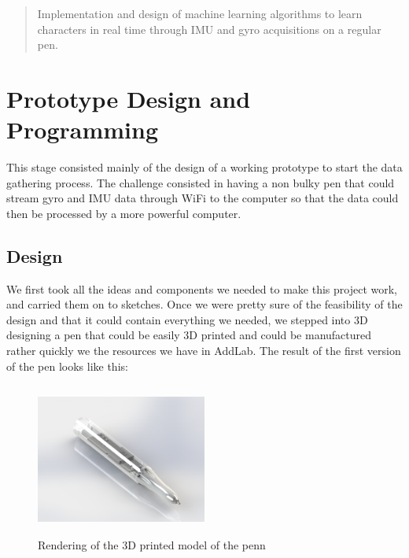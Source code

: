 \documentclass{article}
\begin{document}
 


\begin{abstract} 
Implementation and design of machine learning algorithms to learn characters in real time through IMU and gyro acquisitions on a regular pen.
\end{abstract} 



\section{Prototype Design and Programming}

This stage consisted mainly of the design of a working prototype to start the data gathering process. The challenge consisted in having a non bulky pen that could stream gyro and IMU data through WiFi to the computer so that the data could then be processed by a more powerful computer.

\subsection{Design}

We first took all the ideas and components we needed to make this project work, and carried them on to sketches. Once we were pretty sure of the feasibility of the design and that it could contain everything we needed, we stepped into 3D designing a pen that could be easily 3D printed and could be manufactured rather quickly we the resources we have in AddLab. The result of the first version of the pen looks like this:
\begin{figure}[H]
\centering
    \includegraphics[width=0.5\textwidth, height= 5cm]{pen_render.png}
    \caption{Rendering of the 3D printed model of the penn}
\end{figure}
\end{document}
